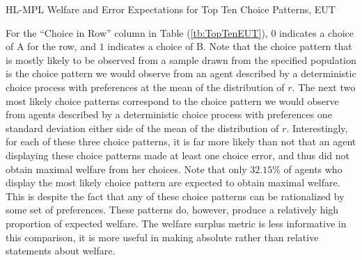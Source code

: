 \documentclass[../main.tex]{subfiles}
\begin{document}
\begin{table}[ht]
	\centering
	\caption{HL-MPL Welfare and Error Expectations for Top Ten Choice Patterns, EUT}
	\label{tb:TopTenEUT}
	\begin{adjustbox}{width=1\textwidth}
	\end{adjustbox}
\end{table}

For the \enquote{Choice in Row} column in Table (\ref{tb:TopTenEUT}), $0$ indicates a choice of A for the row, and $1$ indicates a choice of B.
Note that the choice pattern that is mostly likely to be observed from a sample drawn from the specified population is the choice pattern we would observe from an agent described by a deterministic choice process with preferences at the mean of the distribution of $r$.
The next two most likely choice patterns correspond to the choice pattern we would observe from agents described by a deterministic choice process with preferences one standard deviation either side of the mean of the distribution of $r$.
Interestingly, for each of these three choice patterns, it is far more likely than not that an agent displaying these choice patterns made at least one choice error, and thus did not obtain maximal welfare from her choices.
Note that only $32.15\%$ of agents who display the most likely choice pattern are expected to obtain maximal welfare.
This is despite the fact that any of these choice patterns can be rationalized by some set of preferences.
These patterns do, however, produce a relatively high proportion of expected welfare.
The welfare surplus metric is less informative in this comparison, it is more useful in making absolute rather than relative statements about welfare.
\end{document}
